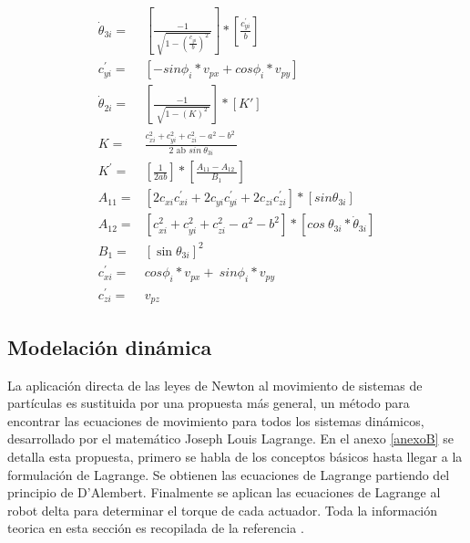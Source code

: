 \newpage

    \begin{align}
        \dot{ \theta }_{3i}={}& \left[ \frac{-1}{\sqrt[]{1- \left( \frac{c_{yi}}{b} \right) ^{2}~}} \right] \ast \left[ \frac{c_{yi}^{'}}{b} \right]
        \label{eq:cap4_eq_44}\\
        c_{yi}^{'}={}& \left[ -sin \phi _{i}\ast v_{px} + cos \phi _{i}\ast v_{py} \right]
        \label{eq:cap4_eq_45}\\
       \dot{ \theta }_{2i}={}& \left[ \frac{-1}{\sqrt[]{1- \left(  K \right) ^{2}~}} \right] \ast \left[ K' \right]
        \label{eq:cap4_eq_46}\\
        K={}& \frac{c_{xi}^{2}+c_{yi}^{2}+c_{zi}^{2}- a^{2}-b^{2}~}{\text{2 ab }sin~ \theta _{3i}}
        \label{eq:cap4_eq_47}\\
       K^{'}={}& \left[ \frac{1}{2ab} \right] \ast \left[ \frac{A_{11}-A_{12}~}{B_{1}} \right]
        \label{eq:cap4_eq_48}\\
        A_{11}={}& \left[ 2c_{xi}c_{xi}^{'}+2c_{yi}c_{yi}^{'}+2c_{zi}c_{zi}^{'} \right] \ast \left[ sin  \theta _{3i} \right]
        \label{eq:cap4_eq_49}\\
        A_{12}={}& \left[ c_{xi}^{2}+c_{yi}^{2}+c_{zi}^{2}- a^{2}-b^{2} \right] \ast \left[ cos~ \theta _{3i}\ast\dot{ \theta }_{3i} \right]
        \label{eq:cap4_eq_50}\\
        B_{1}={}& \left[ \sin  \theta _{3i} \right] ^{2}
        \label{eq:cap4_eq_51}\\
       c_{xi}^{'}={}& cos \phi _{i}\ast v_{px}+~ sin \phi _{i}\ast v_{py}
        \label{eq:cap4_eq_52}\\
       c_{zi}^{'}={}& v_{pz}
        \label{eq:cap4_eq_53}
    \end{align}


         \newpage






    \newpage

    
    \subsection{Modelación dinámica}\label{ma_dina}
            La aplicación directa de las leyes de Newton al movimiento de sistemas de partículas es sustituida por una propuesta más general, un método para encontrar las ecuaciones de movimiento para todos los sistemas dinámicos, desarrollado por el matemático Joseph Louis Lagrange. En el anexo \ref{anexoB} se detalla esta propuesta, primero se habla de los conceptos básicos hasta llegar a la formulación de Lagrange. Se obtienen las ecuaciones de Lagrange partiendo del principio de D’Alembert.  Finalmente se aplican las ecuaciones de Lagrange al robot delta para determinar el torque de cada actuador. Toda la información teorica en esta sección es recopilada de la referencia \cite{INTRO_MECANICA_LAGRAGE}.

